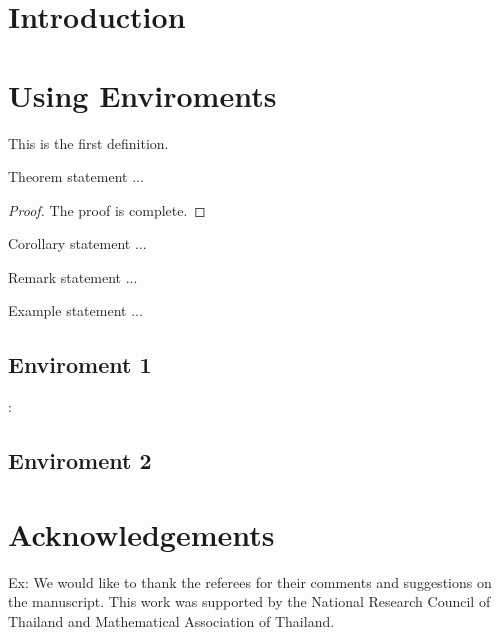 \documentclass[fleqn,reqno,10pt, dvipdfmx]{thaijmath}
\date{\footnotesize{Submission date: xx.xx.xxxx / Acceptance date: xx.xx.xxxx}}
\begin{document}
\setlength{\unitlength}{1cm}
\makeTHAIJMATHtitle
\pagestyle{fancy}

\fancyhead[EL]{\thepage}
\fancyhead[OR]{\thepage}
\fancyfoot[C]{}
\section{Introduction}
\lipsum[2-4]

\section{Using Enviroments}
\begin{definition}
This is the first definition.
\end{definition}

\begin{theorem}
Theorem statement ...
\end{theorem}

\begin{proof}
The proof is complete.
\end{proof}

\begin{corollary}
Corollary statement ...
\end{corollary}

\begin{remark}
Remark statement ...
\end{remark}

\begin{example}
Example  statement ...
\end{example}

\subsection{Enviroment 1}

$\colon$

\subsection{Enviroment 2}

\newpage


\section*{Acknowledgements}
Ex: We would like to thank the referees for
their comments and suggestions on the manuscript. This work was
supported by the National Research Council of Thailand and
Mathematical Association of Thailand. 
\end{document}

